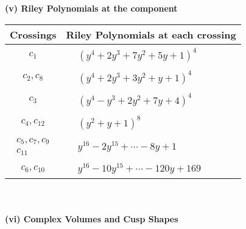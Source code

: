 \documentclass[1p]{elsarticle_modified}
\theoremstyle{definition}
\begin{document}
\newpage\renewcommand{\arraystretch}{1}
\flushleft \textbf{(v) Riley Polynomials at the component}\newline \\
\begin{tabular}{m{50pt}|m{274pt}}
Crossings & \hspace{64pt}Riley Polynomials at each crossing \\
\hline $$\begin{aligned}c_{1}\end{aligned}$$&$\begin{aligned}
&(y^4+2 y^3+7 y^2+5 y+1)^4
\end{aligned}$\\
\hline $$\begin{aligned}c_{2},c_{8}\end{aligned}$$&$\begin{aligned}
&(y^4+2 y^3+3 y^2+y+1)^4
\end{aligned}$\\
\hline $$\begin{aligned}c_{3}\end{aligned}$$&$\begin{aligned}
&(y^4- y^3+2 y^2+7 y+4)^4
\end{aligned}$\\
\hline $$\begin{aligned}c_{4},c_{12}\end{aligned}$$&$\begin{aligned}
&(y^2+y+1)^8
\end{aligned}$\\
\hline $$\begin{aligned}c_{5},c_{7},c_{9}\\c_{11}\end{aligned}$$&$\begin{aligned}
&y^{16}-2 y^{15}+\cdots-8 y+1
\end{aligned}$\\
\hline $$\begin{aligned}c_{6},c_{10}\end{aligned}$$&$\begin{aligned}
&y^{16}-10 y^{15}+\cdots-120 y+169
\end{aligned}$\\
\hline
\end{tabular}\\~\\
\newpage\flushleft \textbf{(vi) Complex Volumes and Cusp Shapes}
\end{document}
